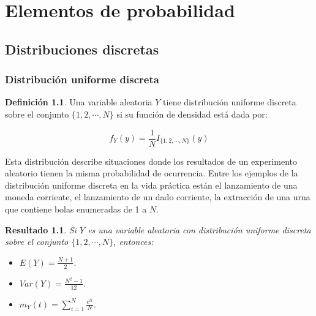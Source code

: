 \documentclass[
  10pt,
  spanish,
]{book}
\providecommand{\tightlist}{%
  \setlength{\itemsep}{0pt}\setlength{\parskip}{0pt}}
\newtheorem{proposition}{Resultado}[chapter]
\theoremstyle{definition}
\newtheorem{definition}{Definición}[chapter]
\theoremstyle{definition}
\theoremstyle{definition}
\theoremstyle{definition}
\theoremstyle{remark}
\begin{document}
\hypertarget{appendix-apuxe9ndice}{%
\appendix}


\hypertarget{elementos-de-probabilidad}{%
\chapter{Elementos de probabilidad}\label{elementos-de-probabilidad}}

\hypertarget{distribuciones-discretas}{%
\section{Distribuciones discretas}\label{distribuciones-discretas}}

\hypertarget{distribuciuxf3n-uniforme-discreta}{%
\subsection{Distribución uniforme discreta}\label{distribuciuxf3n-uniforme-discreta}}

\begin{definition}
\protect\hypertarget{def:unnamed-chunk-1}{}{\label{def:unnamed-chunk-1} }Una variable aleatoria \(Y\) tiene distribución uniforme discreta sobre el conjunto \(\{1,2,\cdots,N\}\) si su función de densidad está dada por:

\begin{equation}
f_Y(y)=\frac{1}{N}I_{\{1,2,\cdots,N\}}(y)
\end{equation}
\end{definition}

Esta distribución describe situaciones donde los resultados de un experimento aleatorio tienen la misma probabilidad de ocurrencia. Entre los ejemplos de la distribución uniforme discreta en la vida práctica están el lanzamiento de una moneda corriente, el lanzamiento de un dado corriente, la extracción de una urna que contiene bolas enumeradas de 1 a \(N\).

\begin{proposition}
\protect\hypertarget{prp:unnamed-chunk-2}{}{\label{prp:unnamed-chunk-2} }Si \(Y\) es una variable aleatoria con distribución uniforme discreta sobre el conjunto \(\{1,2,\cdots,N\}\), entonces:

\begin{itemize}
\tightlist
\item
  \(E(Y)=\frac{N+1}{2}\).
\item
  \(Var(Y)=\frac{N^2-1}{12}\).
\item
  \(m_Y(t)=\sum_{i=1}^N\frac{e^{ti}}{N}\).
\end{itemize}
\end{proposition}
\end{document}
